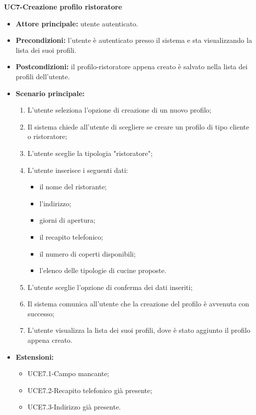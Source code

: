 \textbf{UC7-Creazione profilo ristoratore}
\begin{itemize}
    \item \textbf{Attore principale:} utente autenticato.
    \item \textbf{Precondizioni:} l'utente è autenticato presso il sistema e sta visualizzando la lista dei suoi profili.
    \item \textbf{Postcondizioni:} il profilo-ristoratore appena creato è salvato nella lista dei profili dell'utente.
    \item \textbf{Scenario principale:}
    \begin{enumerate}
        \item L'utente seleziona l'opzione di creazione di un nuovo profilo;
        \item Il sistema chiede all'utente di scegliere se creare un profilo di tipo cliente
        o ristoratore;
        \item L'utente sceglie la tipologia "ristoratore";
        \item L'utente inserisce i seguenti dati:
        \begin{itemize}
            \item il nome del ristorante;
            \item l'indirizzo;
            \item giorni di apertura;
            \item il recapito telefonico;
            \item il numero di coperti disponibili;
            \item l'elenco delle tipologie di cucine proposte.
        \end{itemize}
        \item L'utente sceglie l'opzione di conferma dei dati inseriti;
        \item Il sistema comunica all'utente che la creazione del profilo è avvenuta con successo;
        \item L'utente visualizza la lista dei suoi profili, dove è stato aggiunto il profilo appena creato.
    \end{enumerate}
        \item \textbf{Estensioni:}
        \begin{itemize}
                \item UCE7.1-Campo mancante;
                \item UCE7.2-Recapito telefonico già presente;
                \item UCE7.3-Indirizzo già presente.
        \end{itemize}
\end{itemize}

